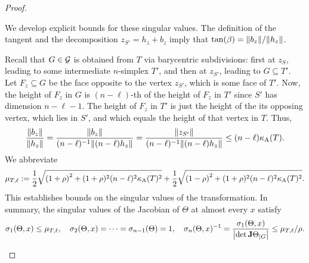 \documentclass[10pt,a4paper]{article}
\begin{document}
\begin{proof}
\begin{itemize}
        We develop explicit bounds for these singular values. 
        The definition of the tangent and the decomposition $z_{S'} = h_{z} + b_{z}$ 
        imply that $\tan(\beta) = \|  b_{z}  \| / \|  h_{z}  \|$.
        
        Recall that $G \in {\mathcal G}$ is obtained from $T$ via barycentric subdivisions: 
        first at $z_{S}$, leading to some intermediate $n$-simplex $T'$, and then at $z_{S'}$, leading to $G \subseteq T'$. 
        Let $F_{z} \subseteq G$ be the face opposite to the vertex $z_{S'}$, which is some face of $T'$.
        Now, the height of $F_{z}$ in $G$ is $(n-\ell)$-th of the height of $F_{z}$ in $T'$
        since $S'$ has dimension $n-\ell-1$. 
        The height of $F_{z}$ in $T'$ is just the height of the its opposing vertex, which lies in $S'$,
        and which equals the height of that vertex in $T$.
        Thus, 
        \begin{align*}
            \frac{ \|  b_{z}  \| }{ \|  h_{z}  \| }
            = 
            \frac{ \|  b_{z}  \| }{ (n-\ell)^{-1} \| (n-\ell) h_{z} \| }
            = 
            \frac{ \|  z_{S'}  \| }{ (n-\ell)^{-1} \| (n-\ell) h_{z} \| }
            \leq 
            (n-\ell) \kappa_{\rm A}(T)
            .
        \end{align*}
        We abbreviate 
        \begin{align}\label{math:upper_bound_for_theta}
            \mu_{T,\ell} 
            := 
            \frac 1 2 \sqrt{ \left( 1 + \rho \right)^{2} + (1+\rho)^{2} (n-\ell)^{2} \kappa_{\rm A}(T)^{2} } 
            + 
            \frac 1 2 \sqrt{ \left( 1 - \rho \right)^{2} + (1+\rho)^{2} (n-\ell)^{2} \kappa_{\rm A}(T)^{2} }
            .
        \end{align}
        This establishes bounds on the singular values of the transformation. 
        In summary, the singular values of the Jacobian of $\Theta$ at almost every $x$ satisfy 
        \begin{align}
            \sigma_{1}(\Theta,x) \leq \mu_{T,\ell},
            \quad 
            \sigma_{2}(\Theta,x) = \dots = \sigma_{n-1}(\Theta) = 1,
            \quad 
            \sigma_{n}(\Theta,x)^{-1} = \frac{ \sigma_{1}(\Theta,x) }{ \left| \det {\mathbf{J}}\Theta_{|G} \right| } \leq \mu_{T,\ell} / \rho.
        \end{align}
        

\end{itemize}
\end{proof}
\end{document}
